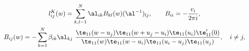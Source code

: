 \begin{equation}
\begin{array}{c}
\displaystyle
l^{K}_{ij}(w)=\sum_{k,l=1}^N \al_{ik} B_{kl}(w)(\al^{-1})_{lj}, \qquad 
B_{ii}=-\frac{v_i}{2\pi i}, \\[0.5cm]
\displaystyle
B_{ij}(w)=-\sum_{k=1}^N \beta_{ik} \al_{kj}~
\frac{\te_{11}(w-u_j)\te_{11}(w+u_j-u_i)\te_{11}(u_i)\te_{11}'(0)}
{\te_{11}(w)\te_{11}(w-u_i)\te_{11}(u_i-u_j)\te_{11}(u_j)},\quad i\neq j,
\end{array}
\label{tL}
\end{equation}

